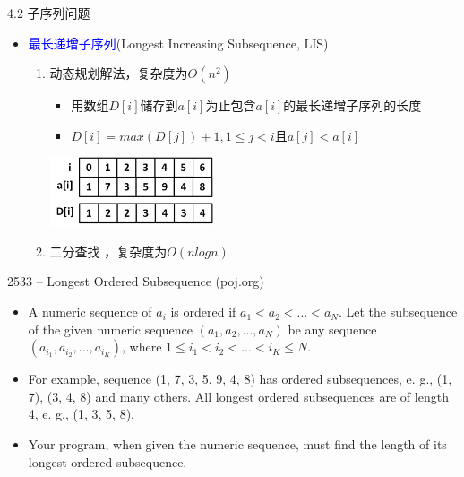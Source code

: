 \begin{frame}{4.2 子序列问题}
    \begin{itemize}
        \item \textcolor{blue}{最长递增子序列}(Longest Increasing Subsequence, LIS)
        \vfill
        \begin{enumerate}
            \item 动态规划解法，复杂度为$O(n^2)$
            \begin{itemize}
                \item 用数组$D[i]$储存到$a[i]$为止包含$a[i]$的最长递增子序列的长度
                \item $D[i]=max⁡(D[j])+1,1\leq j < i$且$a[j] < a[i]$
            \end{itemize}
            \includegraphics[width=0.4\textwidth]{fig/4-4.png}
            \vfill
            \item 二分查找 ，复杂度为$O(nlogn)$
        \end{enumerate}
    \end{itemize}
\end{frame}
\begin{frame}{2533 -- Longest Ordered Subsequence (poj.org)}
    \begin{itemize}
        \item A numeric sequence of $a_i$ is ordered if $a_1 < a_2 < ... < a_N$. Let the subsequence of the given numeric sequence $(a_1, a_2, ..., a_N)$ be any sequence $(a_{i_1}, a_{i_2}, ..., a_{i_K})$, where $1 \leq i_1 < i_2 < ... < i_K \leq N$.
        \item For example, sequence (1, 7, 3, 5, 9, 4, 8) has ordered subsequences, e. g., (1, 7), (3, 4, 8) and many others. All longest ordered subsequences are of length 4, e. g., (1, 3, 5, 8).
        \item Your program, when given the numeric sequence, must find the length of its longest ordered subsequence.
    \end{itemize}
\end{frame}
